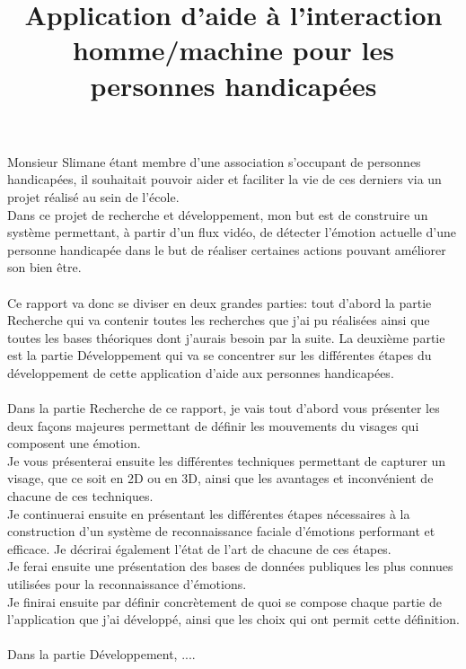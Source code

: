 \documentclass[overfullbox]{polytech/polytech}
\title{Application d'aide à l'interaction homme/machine pour les personnes handicapées}
\begin{document}
\maketitle



Monsieur Slimane étant membre d'une association s'occupant de personnes handicapées, il souhaitait pouvoir aider et faciliter la vie de ces derniers via un projet réalisé au sein de l'école.\\
Dans ce projet de recherche et développement, mon but est de construire un système permettant, à partir d'un flux vidéo, de détecter l'émotion actuelle d'une personne handicapée dans le but de réaliser certaines actions pouvant améliorer son bien être.\\
\\
Ce rapport va donc se diviser en deux grandes parties: tout d'abord la partie Recherche qui va contenir toutes les recherches que j'ai pu réalisées ainsi que toutes les bases théoriques dont j'aurais besoin par la suite. La deuxième partie est la partie Développement qui va se concentrer sur les différentes étapes du développement de cette application d'aide aux personnes handicapées.\\
\\
Dans la partie Recherche de ce rapport, je vais tout d'abord vous présenter les deux façons majeures permettant de définir les mouvements du visages qui composent une émotion.\\
Je vous présenterai ensuite les différentes techniques permettant de capturer un visage, que ce soit en 2D ou en 3D, ainsi que les avantages et inconvénient de chacune de ces techniques.\\
Je continuerai ensuite en présentant les différentes étapes nécessaires à la construction d'un système de reconnaissance faciale d'émotions performant et efficace. Je décrirai également l'état de l'art de chacune de ces étapes.\\
Je ferai ensuite une présentation des bases de données publiques les plus connues utilisées pour la reconnaissance d'émotions.\\
Je finirai ensuite par définir concrètement de quoi se compose chaque partie de l'application que j'ai développé, ainsi que les choix qui ont permit cette définition.\\
\\
Dans la partie Développement, ....
\end{document}
